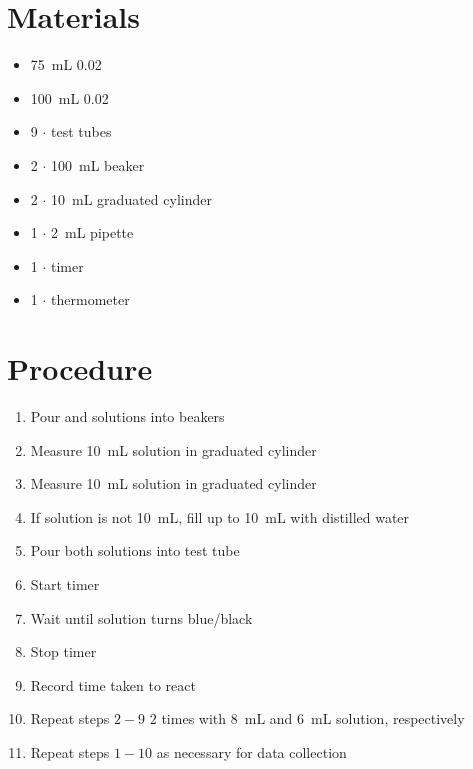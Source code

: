 \documentclass[a4paper]{article}
\begin{document}
    \section{Materials}
        \begin{itemize}
            \item \SI{75}{\mL} \SI{0.02}{\Molar} 
            \item \SI{100}{\mL} \SI{0.02}{\Molar} 
            \item 9 $\cdot$ test tubes
            \item 2 $\cdot$ \SI{100}{\mL} beaker
            \item 2 $\cdot$ \SI{10}{\mL} graduated cylinder
            \item 1 $\cdot$ \SI{2}{\mL} pipette
            \item 1 $\cdot$ timer
            \item 1 $\cdot$ thermometer
        \end{itemize}
    \section{Procedure}
        \begin{enumerate}
            \item Pour  and  solutions into beakers
            \item Measure \SI{10}{\mL}  solution in graduated cylinder
            \item Measure \SI{10}{\mL}  solution in graduated cylinder
            \item If  solution is not \SI{10}{\mL}, fill up to \SI{10}{\mL} with distilled water
            \item Pour both solutions into test tube
            \item Start timer
            \item Wait until solution turns blue/black
            \item Stop timer
            \item Record time taken to react
            \item Repeat steps $2-9$ $2$ times with \SI{8}{\mL} and \SI{6}{\mL}  solution, respectively
            \item Repeat steps $1-10$ as necessary for data collection
        \end{enumerate}
    \newpage
\end{document}
